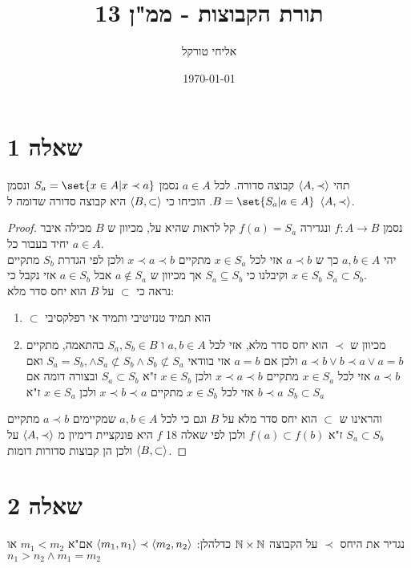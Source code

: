\documentclass{article}
\title{תורת הקבוצות - ממ"ן 13}
\author{אליחי טורקל \ID}
\date\today
\DeclarePairedDelimiter\set\{\}
\begin{document}
	\maketitle %


	\section*{שאלה 1}
	תהי $\langle A, \prec \rangle$ קבוצה סדורה. לכל $a \in A$ נסמן $S_a = \set{x \in A| x \prec a}$
	ונסמן $B = \set{S_a | a \in A}$.
	הוכיחו כי $\langle B, \subset \rangle$ היא קבוצה סדורה שדומה ל $\langle A, \prec \rangle$.
	\begin{proof}
		נסמן $f: A \rightarrow B$ ונגדירה $f(a) = S_a$ קל לראות שהיא על, מכיוון ש $B$ מכילה איבר יחיד בעבור כל $a \in A$. \\
		יהי $a, b \in A$ כך ש $a \prec b$ אזי לכל $x \in S_a$ מתקיים $x \prec a \prec b$ ולכן לפי הגדרת $S_b$ מתקיים $x \in S_b$
		וקיבלנו כי $S_a \subseteq S_b$ אך מכיוון ש $a \not\in S_a$ אבל $a \in S_b$ אזי נקבל כי $S_a \subset S_b$. \\
		נראה כי $\subset$ על $B$ הוא יחס סדר מלא:
		\begin{enumerate}
			\item $\subset$ הוא תמיד טנזיטיבי ותמיד אי רפלקסיבי
			\item מכיוון ש $\prec$ הוא יחס סדר מלא, אזי לכל $a, b \in A$ ו $S_a, S_b \in B$ בהתאמה,
			מתקיים $a \prec b \lor b \prec a \lor a = b$ ולכן אם $a=b$ אזי בוודאי $S_a = S_b, \land S_a \not\subset S_b \land S_b \not\subset S_a$
			ואם $a \prec b$ אזי לכל $x \in S_a$ מתקיים $x \prec a \prec b$ ולכן $x \in S_b$ ז"א $S_a \subset S_b$
			ובצורה דומה אם $b \prec a$ אזי לכל $x \in S_b$ מתקיים $x \prec b \prec a$ ולכן $x \in S_a$ ז"א $S_b \subset S_a$
		\end{enumerate}
		והראינו ש $\subset$ הוא יחס סדר מלא על $B$ וגם כי לכל $a,b \in A$ שמקיימים $a \prec b$ מתקיים $S_a \subset S_b$ ז"א $f(a) \subset f(b)$
		ולכן לפי שאלה 18 $f$ היא פונקציית דימיון מ $\langle A, \prec \rangle$ על $\langle B, \subset \rangle$ ולכן הן קבוצות סדורות דומות.
	\end{proof}

	\section*{שאלה 2}
	נגדיר את היחס $\prec$ על הקבוצה $\mathbb{N} \times \mathbb{N}$ כדלהלן:
	$\langle m_1, n_1 \rangle \prec \langle m_2, n_2 \rangle$ אם"א $m_1 < m_2$ או $n_1 > n_2 \land m_1 = m_2$
\end{document}
